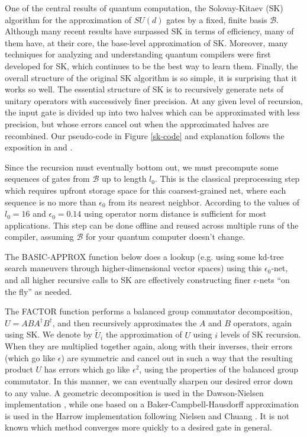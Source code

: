 \documentclass[a0,portrait]{a0poster}
\begin{document}
\begin{multicols}{2}


One of the central results of quantum computation, the Solovay-Kitaev (SK) algorithm for the
approximation of $SU(d)$ gates by a fixed, finite basis $\mathcal{B}$.
Although many recent results have surpassed SK in terms of efficiency,
many of them have, at their core, the base-level approximation of SK. Moreover, many techniques for analyzing
and understanding quantum compilers were first developed for SK, which
continues to be the best way to learn them. Finally, the overall
structure of the original SK algorithm is so simple, it is surprising
that it works so well.
The essential structure of SK is to recursively generate nets of unitary
operators with
successively finer precision. At any given level of recursion, the input 
gate is divided up into two halves which can be
approximated with less precision, but whose errors cancel out
when the approximated halves are recombined. Our pseudo-code 
in Figure \ref{sk-code} and explanation
follows the exposition in \cite{Dawson2005} and \cite{Harrow2001}.

\color{DarkSlateGray} 

Since the recursion must eventually bottom out, we must precompute some sequences
of gates from $\mathcal{B}$ up to length $l_0$. This is the classical
preprocessing step which requires upfront storage space for this
coarsest-grained net, where
each sequence is no more than $\epsilon_0$ from its nearest neighbor. According
to \cite{Dawson2005} the values of $l_0=16$ and $\epsilon_0 = 0.14$ using
operator norm distance is sufficient for most applications.
This step can be
done offline and reused across multiple runs of the compiler, assuming
$\mathcal{B}$ for your quantum computer doesn't change.

The BASIC-APPROX function below does a lookup (e.g. using some kd-tree search
maneuvers through higher-dimensional vector spaces) using this $\epsilon_0$-net,
and all higher recursive calls to SK are effectively constructing
finer $\epsilon$-nets ``on the fly'' as needed.

The FACTOR function performs a balanced group commutator decomposition,
$U = ABA^\dagger B^\dagger$, and then recursively approximates the $A$ and $B$
operators, again using SK. We denote by $\tilde{U}_i$ the approximation
of $U$ using $i$ levels of SK recursion. When they are multiplied
together again, along with their inverses, their errors (which go like
$\epsilon$) are symmetric and cancel out in such a way that the resulting
product $U$ has errors which go like $\epsilon^2$, using the properties of
the balanced group commutator. In this manner, we can
eventually sharpen our desired error down to any value. A
geometric decomposition is used in the Dawson-Nielsen implementation \cite{Dawson2005},
while one based on a Baker-Campbell-Hausdorff approximation is used in the
Harrow implementation \cite{Harrow2001} following
Nielsen and Chuang \cite{Nielsen2000}. It is not
known which method converges more quickly to a desired gate in general.



\end{multicols}
\end{document}
